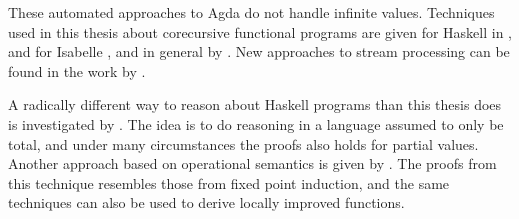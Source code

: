 
These automated approaches to Agda do not handle infinite
values. Techniques used in this thesis about corecursive functional
programs are given for Haskell in \cite{corecursive}, and for Isabelle
\cite{mechanizingcoinduction}, and in general by
\cite{coindtutorial}. New approaches to stream processing can be
found in the work by \cite{streams}.

A radically different way to reason about Haskell programs than this
thesis does is investigated by \cite{fastandloose}. The idea is to do
reasoning in a language assumed to only be total, and under many
circumstances the proofs also holds for partial values. Another
approach based on operational semantics is given by
\cite{totalcorrectness}. The proofs from this technique resembles
those from fixed point induction, and the same techniques can also be
used to derive locally improved functions.

